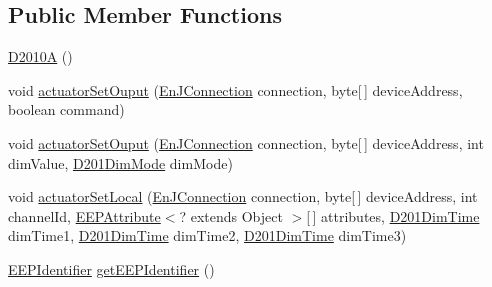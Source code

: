 \subsection*{Public Member Functions}
\begin{DoxyCompactItemize}
\item 
\hyperlink{classit_1_1polito_1_1elite_1_1enocean_1_1enj_1_1eep_1_1eep26_1_1_d2_1_1_d201_1_1_d2010_a_a94d0c2be2776d7886b1eefd7054adeff}{D2010A} ()
\item 
void \hyperlink{classit_1_1polito_1_1elite_1_1enocean_1_1enj_1_1eep_1_1eep26_1_1_d2_1_1_d201_1_1_d2010_a_a1add8486a84a7b131eb8475b1335d90e}{actuator\+Set\+Ouput} (\hyperlink{classit_1_1polito_1_1elite_1_1enocean_1_1enj_1_1communication_1_1_en_j_connection}{En\+J\+Connection} connection, byte\mbox{[}$\,$\mbox{]} device\+Address, boolean command)
\item 
void \hyperlink{classit_1_1polito_1_1elite_1_1enocean_1_1enj_1_1eep_1_1eep26_1_1_d2_1_1_d201_1_1_d2010_a_a84af35fdcb4d59cfed8a589da492653d}{actuator\+Set\+Ouput} (\hyperlink{classit_1_1polito_1_1elite_1_1enocean_1_1enj_1_1communication_1_1_en_j_connection}{En\+J\+Connection} connection, byte\mbox{[}$\,$\mbox{]} device\+Address, int dim\+Value, \hyperlink{enumit_1_1polito_1_1elite_1_1enocean_1_1enj_1_1eep_1_1eep26_1_1_d2_1_1_d201_1_1_d201_dim_mode}{D201\+Dim\+Mode} dim\+Mode)
\item 
void \hyperlink{classit_1_1polito_1_1elite_1_1enocean_1_1enj_1_1eep_1_1eep26_1_1_d2_1_1_d201_1_1_d2010_a_a12dbbb5ad11fb5c0bbb0acf63fea71a6}{actuator\+Set\+Local} (\hyperlink{classit_1_1polito_1_1elite_1_1enocean_1_1enj_1_1communication_1_1_en_j_connection}{En\+J\+Connection} connection, byte\mbox{[}$\,$\mbox{]} device\+Address, int channel\+Id, \hyperlink{classit_1_1polito_1_1elite_1_1enocean_1_1enj_1_1eep_1_1_e_e_p_attribute}{E\+E\+P\+Attribute}$<$? extends Object $>$\mbox{[}$\,$\mbox{]} attributes, \hyperlink{enumit_1_1polito_1_1elite_1_1enocean_1_1enj_1_1eep_1_1eep26_1_1_d2_1_1_d201_1_1_d201_dim_time}{D201\+Dim\+Time} dim\+Time1, \hyperlink{enumit_1_1polito_1_1elite_1_1enocean_1_1enj_1_1eep_1_1eep26_1_1_d2_1_1_d201_1_1_d201_dim_time}{D201\+Dim\+Time} dim\+Time2, \hyperlink{enumit_1_1polito_1_1elite_1_1enocean_1_1enj_1_1eep_1_1eep26_1_1_d2_1_1_d201_1_1_d201_dim_time}{D201\+Dim\+Time} dim\+Time3)
\item 
\hyperlink{classit_1_1polito_1_1elite_1_1enocean_1_1enj_1_1eep_1_1_e_e_p_identifier}{E\+E\+P\+Identifier} \hyperlink{classit_1_1polito_1_1elite_1_1enocean_1_1enj_1_1eep_1_1eep26_1_1_d2_1_1_d201_1_1_d2010_a_ac995a83400be14e79baf39c9306f1a56}{get\+E\+E\+P\+Identifier} ()
\end{DoxyCompactItemize}
